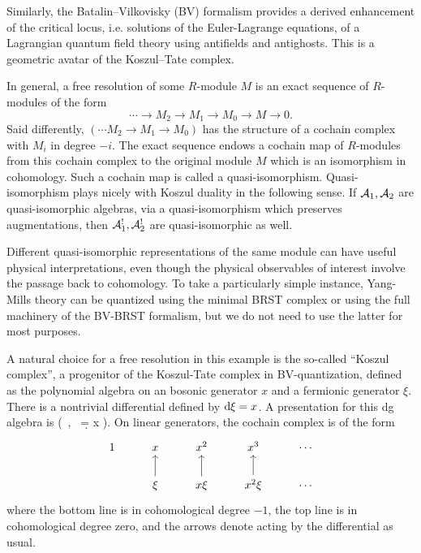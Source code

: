 \documentclass[11pt]{amsart}
\def\natalie#1{{\textcolor{green!65!black}{NMP: {#1}}}}
\begin{document}
Similarly, the Batalin--Vilkovisky (BV) formalism provides a derived enhancement of the critical locus, i.e. solutions of the Euler-Lagrange equations, of a Lagrangian quantum field theory using antifields and antighosts. 
This is a geometric avatar of the Koszul--Tate complex. 

In general, a free resolution of some $R$-module $M$ is an exact sequence of $R$-modules of the form
\[
\cdots \to M_2 \to M_1 \to M_0 \to M \to 0 .
\]
Said differently, $(\cdots M_2 \to M_1 \to M_0)$ has the structure of a cochain complex with $M_i$ in degree $-i$. 
The exact sequence endows a cochain map of $R$-modules from this cochain complex to the original module $M$ which is an isomorphism in cohomology.
Such a cochain map is called a quasi-isomorphism. 
Quasi-isomorphism plays nicely with Koszul duality in the following sense. 
If $\mathcal A_1, \mathcal A_2$ are quasi-isomorphic algebras, via a quasi-isomorphism which preserves augmentations, then $\mathcal A_1^{!}, \mathcal A_2^{!}$ are quasi-isomorphic as well. 

Different quasi-isomorphic representations of the same module can have useful physical interpretations, even though the physical observables of interest involve the passage back to cohomology. 
To take a particularly simple instance, Yang-Mills theory can be quantized using the minimal BRST complex or using the full machinery of the BV-BRST formalism, but we do not need to use the latter for most purposes. 


A natural choice for a free resolution in this example is the so-called ``Koszul complex'', a progenitor of the Koszul-Tate complex in BV-quantization, defined as the polynomial algebra on an bosonic generator $x$ and a fermionic generator $\xi$. 
There is a nontrivial differential defined by ${\rm d} \xi = x$. 
A presentation for this dg algebra is 
\beqn\label{eqn:res1}
\bigg(\CC[x, \xi] \, , \, \d = x \frac{\partial}{\partial \xi} \bigg).
\eeqn
On linear generators, the cochain complex is of the form
\[
\begin{tikzcd} 
1 & x & x^2 & x^3 & \cdots \\
& \xi \ar[u] & x \xi \ar[u] & x^2 \xi \ar[u] & \cdots 
\end{tikzcd}
\]
where the bottom line is in cohomological degree $-1$, the top line is in cohomological degree zero, and the arrows denote acting by the differential as usual. 
\end{document}
